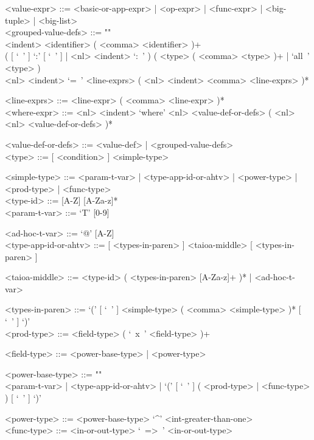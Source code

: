 \documentclass[diploma]{softlab-thesis}
\begin{document}
\begin{grammar}
<value-expr> ::=
<basic-or-app-expr> | <op-expr> | <func-expr> | <big-tuple> | <big-list>
\\

<grouped-value-defs> ::= ""\\
<indent> <identifier> ( <comma> <identifier> )+ \\
( [ `\ ' ] `:' [ `\ ' ] | <nl> <indent> `:\ ' )
( <type> ( <comma> <type> )+ | `all\ ' <type> ) \\
<nl> <indent> `=\ ' <line-exprs> ( <nl> <indent> <comma> <line-exprs> )*

<line-exprs> ::= <line-expr> ( <comma> <line-expr> )*
\\

<where-expr> ::=
<nl> <indent> `where'
<nl> <value-def-or-defs> ( <nl> <nl> <value-def-or-defs> )*

<value-def-or-defs> ::= <value-def> | <grouped-value-defs>
\\

<type> ::= [ <condition> ]  <simple-type>

<simple-type> ::=
<param-t-var> | <type-app-id-or-ahtv> | <power-type> | <prod-type> |
<func-type>
\\

<type-id> ::= [A-Z] [A-Za-z]*
\\

<param-t-var> ::= `T' [0-9]

<ad-hoc-t-var> ::= `@' [A-Z]
\\

<type-app-id-or-ahtv> ::=
[ <types-in-paren> ] <taioa-middle> [ <types-in-paren> ]

<taioa-middle> ::=
<type-id> ( <types-in-paren> [A-Za-z]+ )* | <ad-hoc-t-var>

<types-in-paren> ::=
`(' [ `\ ' ] <simple-type> ( <comma> <simple-type> )* [ `\ ' ] `)'
\\

<prod-type> ::= <field-type> ( `\ x\ ' <field-type> )+

<field-type> ::= <power-base-type> | <power-type>

<power-base-type> ::= ""\\
<param-t-var> | <type-app-id-or-ahtv> |
`(' [ `\ ' ] ( <prod-type> | <func-type> ) [ `\ ' ] `)'

<power-type> ::= <power-base-type> `^' <int-greater-than-one>
\\

<func-type> ::= <in-or-out-type> `\ =>\ ' <in-or-out-type>


\end{grammar}
\end{document}
